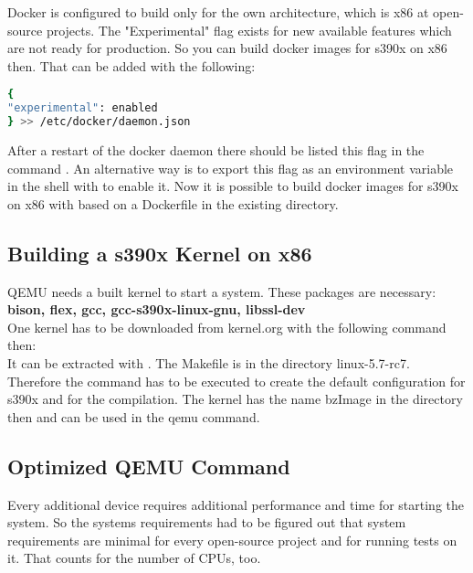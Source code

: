 Docker is configured to build only for the own architecture, which is x86 at open-source projects. The "Experimental" flag exists for new available features which are not ready for production. So you can build docker images for s390x on x86 then. That can be added with the following:

\begin{lstlisting}[language=Bash,caption={Docker Experimental Flag},captionpos=b]
{
"experimental": enabled
} >> /etc/docker/daemon.json
\end{lstlisting}

After a restart of the docker daemon there should be listed this flag in the command . An alternative way is to export this flag as an environment variable in the shell with  to enable it. Now it is possible to build docker images for s390x on x86 with  based on a Dockerfile in the existing directory.

 

 

\subsection{Building a s390x Kernel on x86}

QEMU needs a built kernel to start a system. These packages are necessary: \\
\textbf{bison, flex, gcc, gcc-s390x-linux-gnu, libssl-dev} \\
One kernel has to be downloaded from kernel.org with the following command then: \\
It can be extracted with . The Makefile is in the directory linux-5.7-rc7. Therefore the command  has to be executed to create the default configuration for s390x and  for the compilation. The kernel has the name bzImage in the directory  then and can be used in the qemu command.

\subsection{Optimized QEMU Command}

Every additional device requires additional performance and time for starting the system. 
So the systems requirements had to be figured out that system requirements are minimal for every open-source project and for running tests on it. 
That counts for the number of CPUs, too. \\

